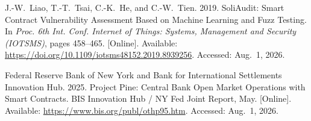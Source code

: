 {\begin{enumerate}[label={[\arabic*]}]
\item J.-W.~Liao, T.-T.~Tsai, C.-K.~He, and C.-W.~Tien. 2019. SoliAudit: Smart Contract Vulnerability Assessment Based on Machine Learning and Fuzz Testing. In \emph{Proc. 6th Int. Conf. Internet of Things: Systems, Management and Security (IOTSMS)}, pages 458--465. [Online]. Available: \url{https://doi.org/10.1109/iotsms48152.2019.8939256}. Accessed: Aug.~1, 2026.

\item Federal Reserve Bank of New York and Bank for International Settlements Innovation Hub. 2025. Project Pine: Central Bank Open Market Operations with Smart Contracts. BIS Innovation Hub / NY Fed Joint Report, May. [Online]. Available: \url{https://www.bis.org/publ/othp95.htm}. Accessed: Aug.~1, 2026.

\end{enumerate}
}





